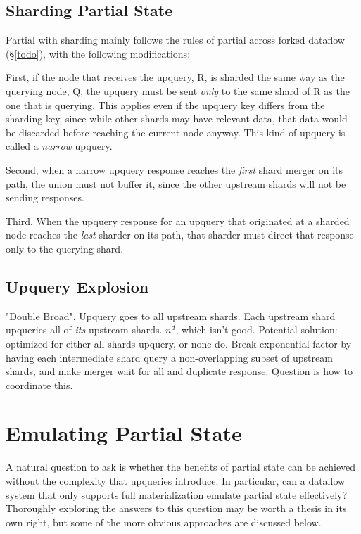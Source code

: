 \subsection{Sharding Partial State}

Partial with sharding mainly follows the rules of partial across forked dataflow
(\S\ref{todo}), with the following modifications:

First, if the node that receives the upquery, R, is sharded the same way as the
querying node, Q, the upquery must be sent \emph{only} to the same shard of R as
the one that is querying. This applies even if the upquery key differs from the
sharding key, since while other shards may have relevant data, that data would
be discarded before reaching the current node anyway. This kind of upquery is
called a \emph{narrow} upquery.

Second, when a narrow upquery response reaches the \emph{first} shard merger on
its path, the union must not buffer it, since the other upstream shards will not
be sending responses.

Third, When the upquery response for an upquery that originated at a sharded
node reaches the \emph{last} sharder on its path, that sharder must direct that
response only to the querying shard.

\subsection{Upquery Explosion}

\begin{inprogress}
  "Double Broad". Upquery goes to all upstream shards. Each upstream shard
  upqueries all of \emph{its} upstream shards. $n^d$, which isn't good.
  Potential solution: optimized for either all shards upquery, or none do. Break
  exponential factor by having each intermediate shard query a non-overlapping
  subset of upstream shards, and make merger wait for all and duplicate
  response. Question is how to coordinate this.
\end{inprogress}

\section{Emulating Partial State}

A natural question to ask is whether the benefits of partial state can be
achieved without the complexity that upqueries introduce. In particular, can a
dataflow system that only supports full materialization emulate partial state
effectively? Thoroughly exploring the answers to this question may be worth a
thesis in its own right, but some of the more obvious approaches are discussed
below.

